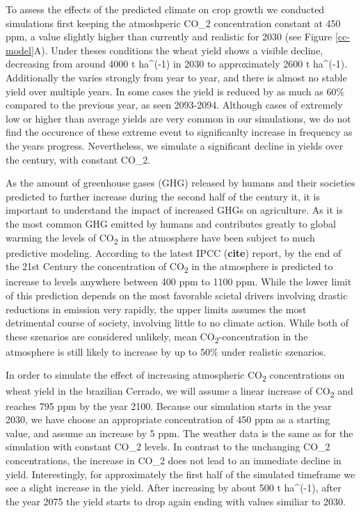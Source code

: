 \documentclass[11pt]{article}
\begin{document}
To assess the effects of the predicted climate on crop growth we conducted simulations first keeping the atmoshperic CO\_2 concentration constant at 450 ppm, a value slightly higher than currently and realistic for 2030 (see Figure \ref{cc-model}A). Under theses conditions the wheat yield shows a visible decline, decreasing from around 4000 t ha\^{}(-1) in 2030 to approximately 2600 t ha\^{}(-1). Additionally the varies strongly from year to year, and there is almost no stable yield over multiple years. In some cases the yield is reduced by as much as 60\% compared to the previous year, as seen 2093-2094. Although cases of extremely low or higher than average yields are very common in our simulations, we do not find the occurence of these extreme event to significanlty increase in frequency as the years progress. Nevertheless, we simulate a significant decline in yields over the century, with constant CO\_2.

As the amount of greenhouse gases (GHG) released by humans and their societies predicted to further increase during the second half of the century it, it is important to understand the impact of increased GHGs on agriculture. As it is the most common GHG emitted by humans and contributes greatly to global warming the levels of CO\textsubscript{2} in the atmosphere have been subject to much predictive modeling. According to the latest IPCC (\textbf{cite}) report, by the end of the 21st Century the concentration of CO\textsubscript{2} in the atmosphere is predicted to increase to levels anywhere between 400 ppm to 1100 ppm. While the lower limit of this prediction depends on the most favorable scietal drivers involving drastic reductions in emission very rapidly, the upper limits assumes the most detrimental course of society, involving little to no climate action. While both of these szenarios are considered unlikely, mean CO\textsubscript{2}-concentration in the atmosphere is still likely to increase by up to 50\% under realistic szenarios.

In order to simulate the effect of increasing atmospheric CO\textsubscript{2} concentrations on wheat yield in the brazilian Cerrado, we will assume a linear increase of CO\textsubscript{2} and reaches 795 ppm by the year 2100. Because our simulation starts in the year 2030, we have choose an appropriate concentration of 450 ppm as a starting value, and assume an increase by 5 ppm. The weather data is the same as for the simulation with constant CO\_2 levels. In contrast to the unchanging CO\_2 concentrations, the increase in CO\_2 does not lead to an immediate decline in yield. Interestingly, for approximately the first half of the simulated timeframe we see a slight increase in the yield. After increasing by about 500 t ha\^{}(-1), after the year 2075 the yield starts to drop again ending with values similiar to 2030.
\end{document}
